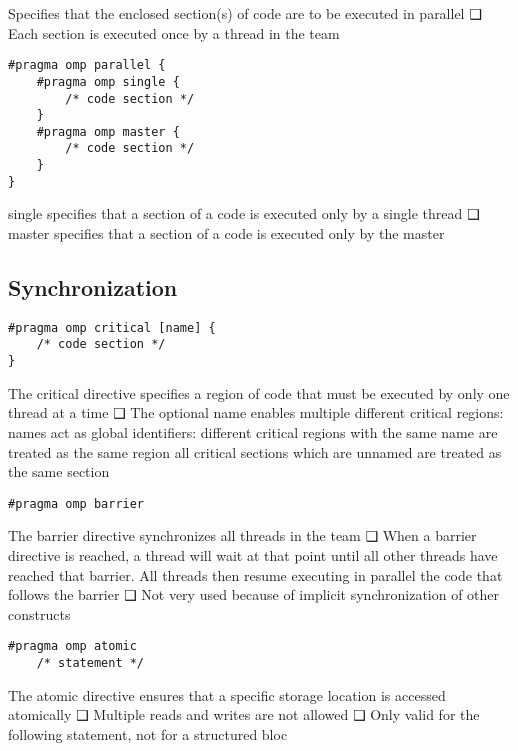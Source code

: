 Specifies that the
enclosed section(s) of
code are to be
executed in parallel
❑ Each section is
executed once by a
thread in the team


\begin{lstlisting}[style=C]
#pragma omp parallel {
    #pragma omp single {
        /* code section */
    }
    #pragma omp master {
        /* code section */
    }
}
\end{lstlisting}
single specifies that a section of a code is
executed only by a single thread
❑ master specifies that a section of a code is
executed only by the master

\subsection{Synchronization}
\begin{lstlisting}[style=C]
#pragma omp critical [name] {
    /* code section */
}
\end{lstlisting}
The critical directive specifies a region of code
that must be executed by only one thread at a time
❑ The optional name enables multiple different
critical regions:
names act as global identifiers: different
critical regions with the same name are
treated as the same region
all critical sections which are unnamed are
treated as the same section
\begin{lstlisting}[style=C]
#pragma omp barrier
\end{lstlisting}
The barrier directive synchronizes all threads in
the team
❑ When a barrier directive is reached, a thread will
wait at that point until all other threads have
reached that barrier. All threads then resume
executing in parallel the code that follows the
barrier
❑ Not very used because of implicit synchronization
of other constructs
\begin{lstlisting}[style=C]
#pragma omp atomic
    /* statement */
\end{lstlisting}
The atomic directive ensures that a specific
storage location is accessed atomically
❑ Multiple reads and writes are not allowed
❑ Only valid for the following statement, not for a
structured bloc

